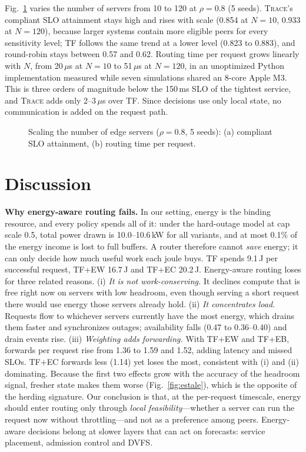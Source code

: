 \documentclass[journal]{IEEEtran}
\newcommand{\sys}{\textsc{Trace}}
\begin{document}
Fig.~\ref{fig:scale} varies the number of servers from 10 to 120 at $\rho=0.8$ (5 seeds). \sys{}'s compliant SLO attainment stays high and rises with scale (0.854 at $N=10$, 0.933 at $N=120$), because larger systems contain more eligible peers for every sensitivity level; TF follows the same trend at a lower level (0.823 to 0.883), and round-robin stays between 0.57 and 0.62. Routing time per request grows linearly with $N$, from 20\,$\mu$s at $N=10$ to 51\,$\mu$s at $N=120$, in an unoptimized Python implementation measured while seven simulations shared an 8-core Apple M3. This is three orders of magnitude below the 150\,ms SLO of the tightest service, and \sys{} adds only 2--3\,$\mu$s over TF. Since decisions use only local state, no communication is added on the request path.

\begin{figure}[t]
\centering
\resizebox{\columnwidth}{!}{%
}
\caption{Scaling the number of edge servers ($\rho=0.8$, 5 seeds): (a) compliant SLO attainment, (b) routing time per request.}
\label{fig:scale}
\end{figure}

\section{Discussion}\label{sec:discussion}

\textbf{Why energy-aware routing fails.}
In our setting, energy is the binding resource, and every policy spends all of it: under the hard-outage model at cap scale 0.5, total power drawn is 10.0--10.6\,kW for all variants, and at most 0.1\% of the energy income is lost to full buffers. A router therefore cannot \emph{save} energy; it can only decide how much useful work each joule buys. TF spends 9.1\,J per successful request, TF+EW 16.7\,J and TF+EC 20.2\,J. Energy-aware routing loses for three related reasons.
(i) \emph{It is not work-conserving.} It declines compute that is free right now on servers with low headroom, even though serving a short request there would use energy those servers already hold.
(ii) \emph{It concentrates load.} Requests flow to whichever servers currently have the most energy, which drains them faster and synchronizes outages; availability falls (0.47 to 0.36--0.40) and drain events rise.
(iii) \emph{Weighting adds forwarding.} With TF+EW and TF+EB, forwards per request rise from 1.36 to 1.59 and 1.52, adding latency and missed SLOs. TF+EC forwards less (1.14) yet loses the most, consistent with (i) and (ii) dominating.
Because the first two effects grow with the accuracy of the headroom signal, fresher state makes them worse (Fig.~\ref{fig:estale}), which is the opposite of the herding signature. Our conclusion is that, at the per-request timescale, energy should enter routing only through \emph{local feasibility}---whether a server can run the request now without throttling---and not as a preference among peers. Energy-aware decisions belong at slower layers that can act on forecasts: service placement, admission control and DVFS.
\end{document}
